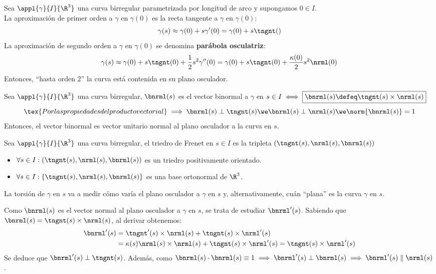 Sea $\appl{\gamma}{I}{\R^3}$ una curva birregular parametrizada por longitud de arco y supongamos $0 \in I$. \\
La aproximación de primer orden a $\gamma$ en $\gamma(0)$ es la recta tangente a $\gamma$ en $\gamma(0)$:
\[\gamma(s)\approx\gamma(0) + s\gamma'(0)=\gamma(0)+s\tngnt()\]
La aproximación de segundo orden a $\gamma$ en $\gamma(0)$ se denomina \textbf{parábola osculatriz}:
\[\gamma(s)\approx\gamma(0) + s\tngnt(0) + \frac{1}{2}s^2\gamma''(0)=\gamma(0) + s\tngnt(0) + \frac{\kappa(0)}{2}s^2\nrml(0)\]
Entonces, ``hasta orden $2$'' la curva está contenida en su plano osculador.
\begin{defn}
	Sea $\appl{\gamma}{I}{\R^3}$ una curva birregular, $\bnrml(s)$ es el vector binormal a $\gamma$ en $s\in I \iff \boxed{\bnrml(s)\defeq\tngnt(s)\times\nrml(s)}$ \\
	\[\tex{Por las propiedades del producto vectorial } \implies \bnrml(s) \perp \tngnt(s) \we \bnrml(s) \perp \nrml(s) \we \norm{\bnrml(s)}=1\]
	Entonces, el vector binormal es vector unitario normal al plano osculador a la curva en $s$.
\end{defn}
\begin{defn}
	Sea $\appl{\gamma}{I}{\R^3}$ una curva birregular, el triedro de Frenet en $s\in I$ es la tripleta $\left(\tngnt(s), \nrml(s), \bnrml(s)\right)$
	\begin{itemize}
		\item $\forall s \in I : \left(\tngnt(s), \nrml(s), \bnrml(s)\right)$ es un triedro positivamente orientado.
		\item $\forall s \in I : \{\tngnt(s), \nrml(s), \bnrml(s)\}$ es una base ortonormal de $\R^3$.
	\end{itemize}
\end{defn}
La torsión de $\gamma$ en $s$ va a medir cómo varía el plano osculador a $\gamma$ en $s$ y, alternativamente, cuán ``plana'' es la curva $\gamma$ en $s$.

Como $\bnrml(s)$ es el vector normal al plano osculador a $\gamma$ en $s$, se trata de estudiar $\bnrml'(s)$. Sabiendo que $\bnrml(s)=\tngnt(s)\times\nrml(s)$, al derivar obtenemos:
\[\begin{aligned}
	\bnrml'(s)&=\tngnt'(s)\times\nrml(s)+\tngnt(s)\times\nrml'(s) \\
	&= \kappa(s)\nrml(s)\times\nrml(s)+\tngnt(s)\times\nrml'(s) = \tngnt(s)\times\nrml'(s)
\end{aligned}\]
Se deduce que $\bnrml'(s) \perp \tngnt(s)$. Además, como $\bnrml(s)\cdot\bnrml(s)\equiv1 \implies \bnrml'(s)\perp\bnrml(s) \implies \bnrml'(s) \parallel \nrml(s)$.

